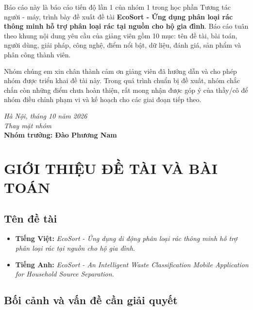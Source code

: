\documentclass[13pt,a4paper,oneside]{report}
\renewcommand{\thechapter}{\Roman{chapter}}
\newcommand{\leftchapter}{%
  \titleformat{\chapter}[hang]{\normalfont\Large\bfseries\raggedright}{\thechapter.}{0.5em}{}%
}
\begin{document}
Báo cáo này là báo cáo tiến độ lần 1 của nhóm 1 trong học phần Tương tác người - máy, trình bày đề xuất đề tài \textbf{EcoSort - Ứng dụng phân loại rác thông minh hỗ trợ phân loại rác tại nguồn cho hộ gia đình}. Báo cáo tuân theo khung nội dung yêu cầu của giảng viên gồm 10 mục: tên đề tài, bài toán, người dùng, giải pháp, công nghệ, điểm nổi bật, dữ liệu, đánh giá, sản phẩm và phân công thành viên.

Nhóm chúng em xin chân thành cảm ơn giảng viên đã hướng dẫn và cho phép nhóm được triển khai đề tài này. Trong quá trình chuẩn bị đề xuất, nhóm chắc chắn còn những điểm chưa hoàn thiện, rất mong nhận được góp ý của thầy/cô để nhóm điều chỉnh phạm vi và kế hoạch cho các giai đoạn tiếp theo.

\begin{flushright}
\textit{Hà Nội, tháng 10 năm 2026}\\
\textit{Thay mặt nhóm}\\[36pt]
\textbf{Nhóm trưởng: Đào Phương Nam}
\end{flushright}

\newpage
\tableofcontents

\leftchapter

\chapter{GIỚI THIỆU ĐỀ TÀI VÀ BÀI TOÁN}

\section{Tên đề tài}

\begin{itemize}[leftmargin=1.5cm]
    \item \textbf{Tiếng Việt:} \textit{EcoSort - Ứng dụng di động phân loại rác thông minh hỗ trợ phân loại rác tại nguồn cho hộ gia đình.}
    \item \textbf{Tiếng Anh:} \textit{EcoSort - An Intelligent Waste Classification Mobile Application for Household Source Separation.}
\end{itemize}

\section{Bối cảnh và vấn đề cần giải quyết}
\end{document}

